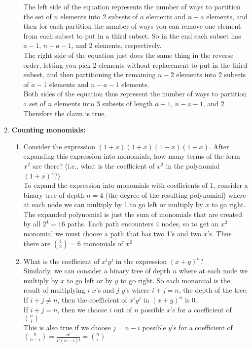 \documentclass[11pt,fleqn]{article}
\begin{document}
\begin{enumerate}
\begin{enumerate}
The left side of the equation represents the number of ways to partition the set of $n$ elements into 2 subsets of $a$ elements and $n-a$ elements, and then for each partition the number of ways you can remove one element from each subset to put in a third subset. So in the end each subset has $a-1$, $n-a-1$, and $2$ elements, respectively. \\
The right side of the equation just does the same thing in the reverse order, letting you pick 2 elements without replacement to put in the third subset, and then partitioning the remaining $n-2$ elements into 2 subsets of $a-1$ elements and $n-a-1$ elements. \\
Both sides of the equation thus represent the number of ways to partition a set of $n$ elements into 3 subsets of length $a-1$, $n-a-1$, and $2$. Therefore the claim is true.
\end{enumerate}

\newpage
\item \textbf{Counting monomials:}

\begin{enumerate}
\item Consider the expression $(1+x)(1+x)(1+x)(1+x)$.
After expanding this expression into monomials, how many terms of the form $x^2$ are there?
(i.e., what is the coefficient of $x^2$ in the polynomial $(1+x)^4$?) \\
To expand the expression into monomials with coefficients of 1, consider a binary tree of depth $n=4$ (the degree of the resulting polynomial) where at each node we can multiply by 1 to go left or multiply by $x$ to go right. The expanded polynomial is just the sum of monomials that are created by all $2^4 = 16$ paths. Each path encounters 4 nodes, so to get an $x^2$ monomial we must choose a path that has two 1's and two $x$'s. Thus there are $\binom{4}{2} = 6$ monomials of $x^2$
\item What is the coefficient of $x^i y^j$ in the expression $(x+y)^n$? \\
Similarly, we can consider a binary tree of depth $n$ where at each node we multiply by $x$ to go left or by $y$ to go right. So each monomial is the result of multiplying $i$ $x$'s and $j$ $y$'s where $i+j=n$, the depth of the tree. \\
If $i+j\neq n$, then the coefficient of $x^i y^j$ in $(x+y)^n$ is 0. \\
If $i+j=n$, then we choose $i$ out of $n$ possible $x$'s for a coefficient of $\binom{n}{i}$ \\
This is also true if we choose $j=n-i$ possible $y$'s for a coefficient of $\binom{n}{n-i} = \frac{n!}{i!(n-i)!} = \binom{n}{i}$
\end{enumerate}


\end{enumerate}
\end{document}
